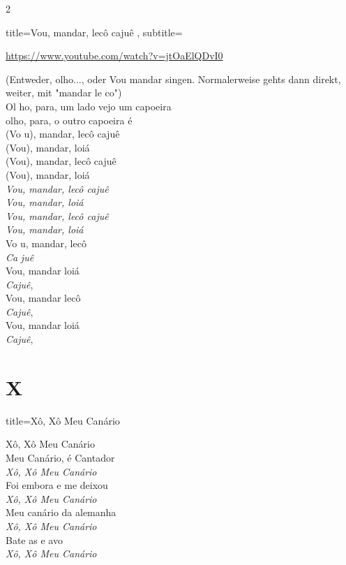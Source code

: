 \documentclass[fontsize=14pt, paper=a4, twoside, DIV=20]{scrreprt} %
\newcommand\chapTOC[1]{
    \chapter*{#1}
    \addcontentsline{toc}{chapter}{#1}
    \markboth{#1}{#1}}
\begin{document}
\begin{multicols*}{2}
\columnbreak
\begin{song}{title={Vou, mandar, lecô cajuê }, subtitle={\begin{small}
            \url{https://www.youtube.com/watch?v=jtOaElQDvI0}
\end{small}}}
        \begin{verse*}
(Entweder, olho..., oder Vou mandar singen. Normalerweise gehts dann
direkt, weiter, mit "mandar le co")\\
Ol ho, para, um lado vejo um capoeira\\
olho, para, o outro capoeira é\\
(Vo u), mandar, lecô cajuê\\
(Vou), mandar, loiá\\
(Vou), mandar, lecô cajuê\\
(Vou), mandar, loiá\\
\textit{Vou, mandar, lecô cajuê}\\
\textit{Vou, mandar, loiá}\\
\textit{Vou, mandar, lecô cajuê}\\
\textit{Vou, mandar, loiá}\\
Vo u, mandar, lecô\\
\textit{Ca} \textit{juê}\\
Vou, mandar loiá\\
\textit{Cajuê},\\
Vou, mandar lecô\\
\textit{Cajuê},\\
Vou, mandar loiá\\
\textit{Cajuê},\\
        \end{verse*}
\end{song}

\chapTOC{X}

\begin{song}{title={Xô, Xô Meu Canário}}
    \begin{verse*}
    Xô, Xô Meu Canário\\
    Meu Canário, é Cantador\\
    \textit{Xô, Xô Meu Canário}\\
    Foi embora e me deixou\\
    \textit{Xô, Xô Meu Canário}\\
    Meu canário da alemanha\\
    \textit{Xô, Xô Meu Canário}\\
    Bate as e avo\\
    \textit{Xô, Xô Meu Canário}\\
    \end{verse*}
\end{song}


\end{multicols*}
\end{document}
